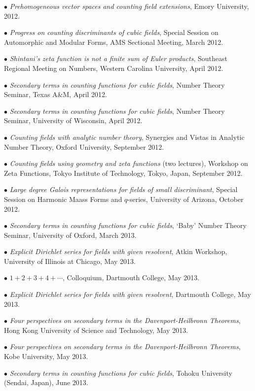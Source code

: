 \documentclass{article}
\newcommand{\categorywidth}{1in}        %
\newcommand{\categorysep}{5pt}
\newcommand{\catlistlabel}[1]%
{\raisebox{0pt}[1ex][0pt]{\makebox[\labelwidth][l]%
    {\parbox[t]{\labelwidth}{\hspace{0pt}\textbf{#1}}}}}
\newenvironment{categories}{\begin{list}{}{
      \setlength{\labelwidth}{\categorywidth}
      \setlength{\leftmargin}{\labelwidth}
      \addtolength{\leftmargin}{\labelsep}
      \setlength{\topsep}{20pt}
      \setlength{\itemsep}{\categorysep}
      \renewcommand{\makelabel}{\catlistlabel}
      }}{\end{list}}
\begin{document}
\begin{flushleft}
\begin{categories}
$\bullet$ {\itshape Prehomogeneous vector spaces and counting field extensions},
Emory University, 2012.

$\bullet$ {\itshape Progress on counting discriminants of cubic fields}, 
Special Session on Automorphic and Modular Forms, AMS Sectional Meeting, March 2012.

$\bullet$ {\itshape Shintani's zeta function is not a finite sum of Euler products},
Southeast Regional Meeting on Numbers, Western Carolina University, April 2012.

$\bullet$ {\itshape Secondary terms in counting functions for cubic fields},
Number Theory Seminar, Texas A\&M, April 2012.

$\bullet$ {\itshape Secondary terms in counting functions for cubic fields},
Number Theory Seminar, University of Wisconsin, April 2012.

$\bullet$ {\itshape Counting fields with analytic number theory},
Synergies and Vistas in Analytic Number Theory, Oxford University, September 2012.

$\bullet$ {\itshape Counting fields using geometry and zeta functions} (two lectures),
Workshop on Zeta Functions, Tokyo Institute of Technology, Tokyo, Japan, September 2012.

$\bullet$ {\itshape Large degree Galois representations for fields of small discriminant},
Special Session on Harmonic Maass Forms and $q$-series, University of Arizona, October 2012.

$\bullet$ {\itshape Secondary terms in counting functions for cubic fields},
`Baby' Number Theory Seminar, University of Oxford, March 2013.

$\bullet$ {\itshape Explicit Dirichlet series for fields with given resolvent},
Atkin Workshop, University of Illinois at Chicago, May 2013.

$\bullet$ {\itshape $1 + 2 + 3 + 4 + \cdots$}, Colloquium, Dartmouth College, May 2013.

$\bullet$ {\itshape Explicit Dirichlet series for fields with given resolvent},
Dartmouth College, May 2013.

$\bullet$ {\itshape Four perspectives on secondary terms in the Davenport-Heilbronn Theorems},
Hong Kong University of Science and Technology, May 2013.

$\bullet$ {\itshape Four perspectives on secondary terms in the Davenport-Heilbronn Theorems},
Kobe University, May 2013.

$\bullet$ {\itshape Secondary terms in counting functions for cubic fields},
Tohoku University (Sendai, Japan), June 2013.


\end{categories}
\end{flushleft}
\end{document}
